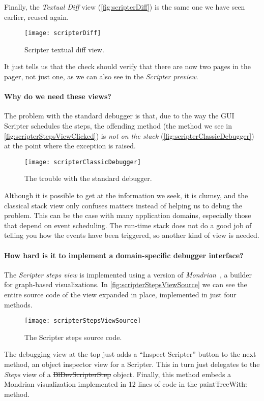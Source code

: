 \documentclass[sigplan,anonymous,review,10pt]{acmart}
\begin{document}
Finally, the \emph{Textual Diff} view (\autoref{fig:scripterDiff}) is the same one we have seen earlier, reused again.
\begin{figure}[h]
  \texttt{[image: scripterDiff]}
  \caption{Scripter textual diff view.}
  \label{fig:scripterDiff}
\end{figure}
It just tells us that the check should verify that there are now two pages in the pager, not just one, as we can also see in the \emph{Scripter preview}.

\paragraph{Why do we need these views?}
The problem with the standard debugger is that, due to the way the GUI Scripter schedules the steps, the offending method (\ie the  method we see in \autoref{fig:scripterStepsViewClicked}) is \emph{not on the stack} (\autoref{fig:scripterClassicDebugger}) at the point where the exception is raised.
\begin{figure}[h]
  \texttt{[image: scripterClassicDebugger]}
  \caption{The trouble with the standard debugger.}
  \label{fig:scripterClassicDebugger}
\end{figure}
Although it is possible to get at the information we seek, it is clumsy, and the classical stack view only confuses matters instead of helping us to debug the problem.
This can be the case with many application domains, especially those that depend on event scheduling.
The run-time stack does not do a good job of telling you how the events have been triggered, so another kind of view is needed.

\paragraph{How hard is it to implement a domain-specific debugger interface?}
The \emph{Scripter steps view} is implemented using a version of \emph{Mondrian}~\cite{Pena13b,Meye06a}, a builder for graph-based visualizations.
In \autoref{fig:scripterStepsViewSource} we can see the entire source code of the view expanded in place, implemented in just four methods.
\begin{figure}[h]
  \texttt{[image: scripterStepsViewSource]}
  \caption{The Scripter steps source code.}
  \label{fig:scripterStepsViewSource}
\end{figure}
The debugging view at the top just adds a ``Inspect Scripter'' button to the next method, an object inspector view for a Scripter.
This in turn just delegates to the \emph{Steps} view of a \st{BlDevScripterStep} object.
Finally, this method embeds a Mondrian visualization implemented in 12 lines of code in the \st{paintTreeWith:} method.
\end{document}
